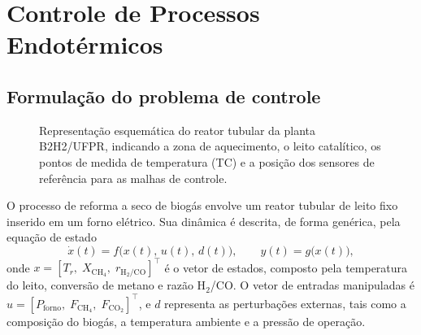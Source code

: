 
\section{Controle de Processos Endotérmicos}
\label{sec:controle_endotermico}

\subsection{Formulação do problema de controle}
\label{sec:formulacao}

\begin{figure}[ht]
\begin{center}
\fbox{\parbox{7.5cm}{\centering\vspace{1.2cm}
{\small [FIGURA A INSERIR]\\[4pt]
Representação esquemática do reator tubular da planta B2H2/UFPR\\[2pt]
(forno, leito catalítico, termopares e malhas de controle)}\vspace{1.2cm}}}
\caption{Representação esquemática do reator tubular da planta B2H2/UFPR,
indicando a zona de aquecimento, o leito catalítico, os pontos de medida
de temperatura (TC) e a posição dos sensores de referência para as
malhas de controle.}
\label{fig:reator}
\end{center}
\end{figure}

O processo de reforma a seco de biogás envolve um reator tubular de leito
fixo inserido em um forno elétrico. Sua dinâmica é descrita, de forma
genérica, pela equação de estado
\begin{equation}
  \dot{x}(t) = f\bigl(x(t),\,u(t),\,d(t)\bigr), \qquad y(t) = g\bigl(x(t)\bigr),
  \label{eq:estadogenerico}
\end{equation}
onde $x = [T_r,\; X_{\mathrm{CH}_4},\; r_{\mathrm{H}_2/\mathrm{CO}}]^\top$
é o vetor de estados, composto pela temperatura do leito, conversão de
metano e razão H\(_2\)/CO. O vetor de entradas manipuladas é
$u = [P_{\mathrm{forno}},\; F_{\mathrm{CH}_4},\; F_{\mathrm{CO}_2}]^\top$,
e $d$ representa as perturbações externas, tais como a composição do
biogás, a temperatura ambiente e a pressão de operação.\citep{oliveira2021,luyben2014}

